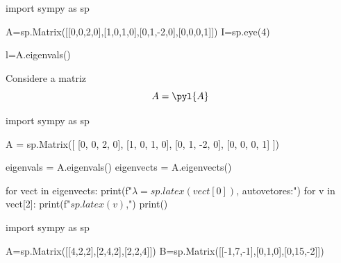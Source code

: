 
\begin{pycode}
import sympy as sp

A=sp.Matrix([[0,0,2,0],[1,0,1,0],[0,1,-2,0],[0,0,0,1]])
I=sp.eye(4)

l=A.eigenvals()
\end{pycode}

\question Considere a matriz
\[A=
\pyl{A}
\]


\begin{solution}

\begin{pycode}
import sympy as sp

A = sp.Matrix([
    [0, 0, 2, 0],
    [1, 0, 1, 0],
    [0, 1, -2, 0],
    [0, 0, 0, 1]
])

eigenvals = A.eigenvals()
eigenvects = A.eigenvects()

for vect in eigenvects:
    print(f"$\lambda={sp.latex(vect[0])}$, autovetores:")
    for v in vect[2]:
        print(f"${sp.latex(v)}$,")
    print()

\end{pycode}


\end{solution}


\begin{pycode}
import sympy as sp

A=sp.Matrix([[4,2,2],[2,4,2],[2,2,4]])
B=sp.Matrix([[-1,7,-1],[0,1,0],[0,15,-2]])
\end{pycode}

\question 
{}








